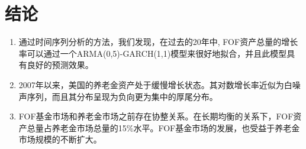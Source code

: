 
\section{结论}
    \begin{enumerate}
        \item 通过时间序列分析的方法，我们发现，在过去的20年中, FOF资产总量的增长率可以通过一个ARMA(0,5)-GARCH(1,1)模型来很好地拟合，并且此模型具有良好的预测效果。
        \item 2007年以来，美国的养老金资产处于缓慢增长状态。其对数增长率近似为白噪声序列，而且其分布呈现为负向更为集中的厚尾分布。
        \item FOF基金市场和养老金市场之前存在协整关系。在长期均衡的关系下，FOF资产总量占养老金市场总量的15\%水平。FOF基金市场的发展，也受益于养老金市场规模的不断扩大。
    \end{enumerate}

\clearpage
